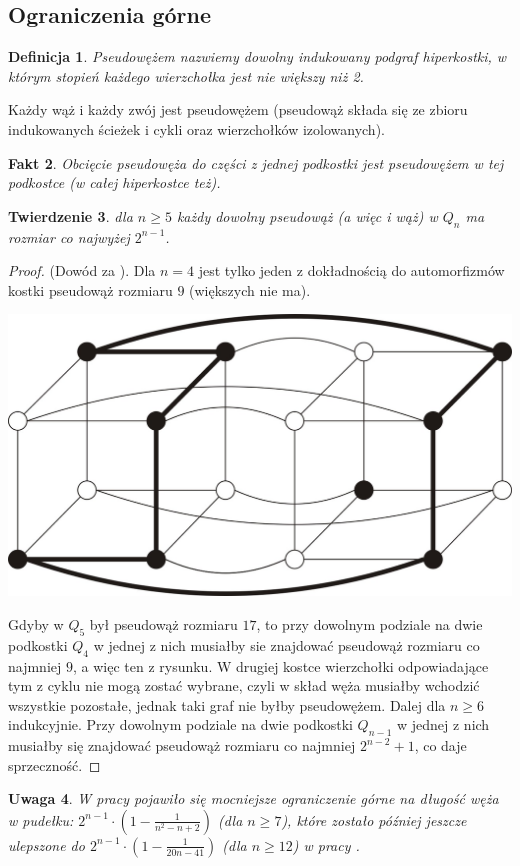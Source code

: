 \documentclass{pracamgr}
\newtheorem{theorem}{Twierdzenie}[chapter]
\newtheorem{defi}[theorem]{Definicja}
\newtheorem{remark}[theorem]{Uwaga}
\newtheorem{fact}[theorem]{Fakt}
\begin{document}
    \subsection{Ograniczenia górne}
     \begin{defi}\label{pseudowąż}
      \emph{Pseudowężem} nazwiemy dowolny indukowany podgraf hiperkostki, w którym stopień każdego wierzchołka jest nie większy niż 2. 
     \end{defi}
     Każdy wąż i każdy zwój jest pseudowężem (pseudowąż składa się ze zbioru indukowanych ścieżek i cykli oraz wierzchołków izolowanych).
     \begin{fact}
      Obcięcie pseudowęża do części z jednej podkostki jest pseudowężem w tej podkostce (w całej hiperkostce też).
     \end{fact}
    \begin{theorem}
     dla $n\ge5$ każdy dowolny pseudowąż (a więc i wąż) w $Q_n$ ma rozmiar co najwyżej $2^{n-1}$.
    \end{theorem}
    \begin{proof}
     (Dowód za \cite{Snake1}).
     Dla $n=4$ jest tylko jeden z dokładnością do automorfizmów kostki pseudowąż rozmiaru $9$ (większych nie ma).
     \begin{center}
      \includegraphics[scale=0.4]{img/pseudoS_4.jpg}
     \end{center}
     Gdyby w $Q_5$ był pseudowąż rozmiaru $17$, to przy dowolnym podziale na dwie podkostki $Q_4$ w jednej z nich musiałby sie znajdować pseudowąż
     rozmiaru co najmniej $9$, a więc ten z rysunku. W drugiej kostce wierzchołki odpowiadające tym z cyklu nie mogą zostać wybrane,
     czyli w skład węża musiałby wchodzić wszystkie pozostałe, jednak taki graf nie byłby pseudowężem.\newline
     Dalej dla $n\ge6$ indukcyjnie. Przy dowolnym podziale na dwie podkostki $Q_{n-1}$ w jednej z nich musiałby się znajdować pseudowąż rozmiaru co najmniej
     $2^{n-2}+1$, co daje sprzeczność.
    \end{proof}
    \begin{remark}
     W pracy \cite{Snake3} pojawiło się mocniejsze ograniczenie górne na długość węża w pudełku:
     $2^{n-1}\cdot(1-\frac{1}{n^2-n+2})$ (dla $n\ge7$), które zostało później jeszcze ulepszone do\newline
     $2^{n-1}\cdot(1-\frac{1}{20n-41})$ (dla $n\ge12$) w pracy \cite{Snake4}.
    \end{remark}
\end{document}
